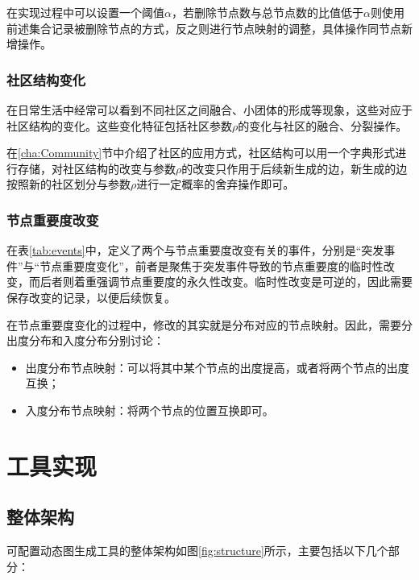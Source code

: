 在实现过程中可以设置一个阈值$\alpha$，若删除节点数与总节点数的比值低于$\alpha$则使用前述集合记录被删除节点的方式，反之则进行节点映射的调整，具体操作同节点新增操作。

\subsubsection{社区结构变化}

在日常生活中经常可以看到不同社区之间融合、小团体的形成等现象，这些对应于社区结构的变化。这些变化特征包括社区参数$\rho$的变化与社区的融合、分裂操作。

在\ref{cha:Community}节中介绍了社区的应用方式，社区结构可以用一个字典形式进行存储，对社区结构的改变与参数$\rho$的改变只作用于后续新生成的边，新生成的边按照新的社区划分与参数$\rho$进行一定概率的舍弃操作即可。

\subsubsection{节点重要度改变}

在表\ref{tab:events}中，定义了两个与节点重要度改变有关的事件，分别是“突发事件”与“节点重要度变化”，前者是聚焦于突发事件导致的节点重要度的临时性改变，而后者则着重强调节点重要度的永久性改变。临时性改变是可逆的，因此需要保存改变的记录，以便后续恢复。

在节点重要度变化的过程中，修改的其实就是分布对应的节点映射。因此，需要分出度分布和入度分布分别讨论：

\begin{itemize}
  \item 出度分布节点映射：可以将其中某个节点的出度提高，或者将两个节点的出度互换；
  \item 入度分布节点映射：将两个节点的位置互换即可。
\end{itemize}

\vspace{0.2cm}

\section{工具实现}
\label{cha:tool_implementation}

\subsection{整体架构}

可配置动态图生成工具的整体架构如图\ref{fig:structure}所示，主要包括以下几个部分：

